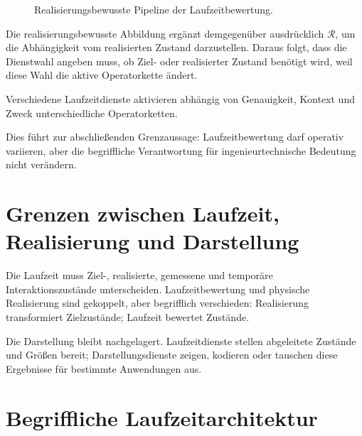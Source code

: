 \begin{figure}[ht]
\centering

\caption{Realisierungsbewusste Pipeline der Laufzeitbewertung.}
\label{fig:realization-pipeline}
\end{figure}

Die realisierungsbewusste Abbildung ergänzt demgegenüber ausdrücklich
\(\mathcal R\), um die Abhängigkeit vom realisierten Zustand darzustellen.
Daraus folgt, dass die Dienstwahl angeben muss, ob Ziel- oder realisierter
Zustand benötigt wird, weil diese Wahl die aktive Operatorkette ändert.

Verschiedene Laufzeitdienste aktivieren abhängig von Genauigkeit, Kontext und
Zweck unterschiedliche Operatorketten.

Dies führt zur abschließenden Grenzaussage: Laufzeitbewertung darf operativ
variieren, aber die begriffliche Verantwortung für ingenieurtechnische
Bedeutung nicht verändern.

\section{Grenzen zwischen Laufzeit, Realisierung und Darstellung}

Die Laufzeit muss Ziel-, realisierte, gemessene und temporäre
Interaktionszustände unterscheiden. Laufzeitbewertung und physische
Realisierung sind gekoppelt, aber begrifflich verschieden: Realisierung
transformiert Zielzustände; Laufzeit bewertet Zustände.

Die Darstellung bleibt nachgelagert. Laufzeitdienste stellen abgeleitete
Zustände und Größen bereit; Darstellungsdienste zeigen, kodieren oder tauschen
diese Ergebnisse für bestimmte Anwendungen aus.

\section{Begriffliche Laufzeitarchitektur}

